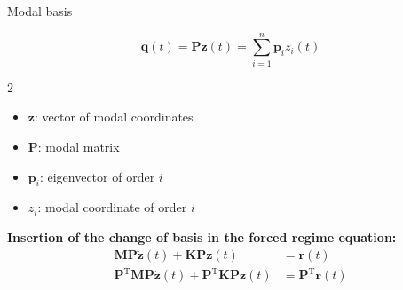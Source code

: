 \documentclass[aspectratio=169]{beamer}
\begin{document}
\begin{frame}{Modal basis}
  \begin{center}
  \end{center}
  \[
    \mathbf{q}(t) = \mathbf{P} \mathbf{z}(t) = \sum_{i=1}^{n} \mathbf{p}_{i} z_i(t)
  \]
  \vspace{-0.5cm}
  \begin{multicols}{2}
    \begin{itemize}
      \item $\mathbf{z}$: vector of modal coordinates
      \item $\mathbf{P}$: modal matrix
      \item $\mathbf{p}_{i}$: eigenvector of order $i$
      \item $z_i$: modal coordinate of order $i$
    \end{itemize}
  \end{multicols}
  \begin{block}{}
    \textbf{Insertion of the change of basis in the forced regime equation:}
    \vspace{-0.1cm}
    \begin{align*}
      \mathbf{M} \mathbf{P}\ddot{\mathbf{z}}(t)  + \mathbf{K} \mathbf{P} \mathbf{z}(t)                                            & = \mathbf{r}(t)                       \\
      \mathbf{P}^\mathrm{T} \mathbf{M} \mathbf{P} \ddot{\mathbf{z}}(t) +\mathbf{P}^\mathrm{T} \mathbf{K} \mathbf{P} \mathbf{z}(t) & = \mathbf{P}^\mathrm{T} \mathbf{r}(t)
    \end{align*}
  \end{block}
\end{frame}
\end{document}
